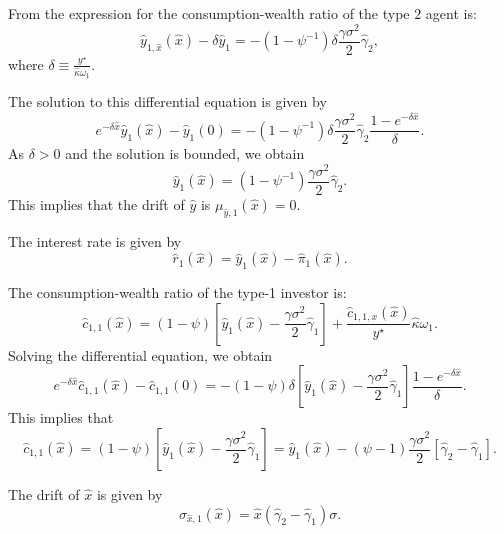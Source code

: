 \documentclass[11pt,english]{article}
\begin{document}
From the expression for the consumption-wealth ratio of the type $2$ agent is:
\begin{equation}
    \hat{y}_{1,\hat{x}}(\hat{x})-\delta \hat{y}_{1} = -(1-\psi^{-1}) \delta  \frac{\gamma\sigma^2 }{2} \hat{\gamma}_2,
\end{equation}
where $\delta \equiv \frac{y^\star}{\hat{\kappa} \omega_1}$.

The solution to this differential equation is given by
\begin{equation}
    e^ {-\delta \hat{x}} \hat{y}_1(\hat{x}) - \hat{y}_1(0) = - (1-\psi^{-1}) \delta  \frac{\gamma\sigma^2 }{2} \hat{\gamma}_2 \frac{1 - e^{-\delta \hat{x}}}{\delta}.
\end{equation}
As $\delta > 0$ and the solution is bounded, we obtain
\begin{equation}
    \hat{y}_1(\hat{x}) = (1-\psi^{-1}) \frac{\gamma\sigma^2 }{2} \hat{\gamma}_2 .
\end{equation}
This implies that the drift of $\hat{y}$ is $\mu_{\hat{y},1}(\hat{x}) = 0$.

The interest rate is given by
\begin{equation}
    \hat{r}_1(\hat{x}) = \hat{y}_1(\hat{x}) - \hat{\pi}_1(\hat{x}).
\end{equation}

The consumption-wealth ratio of the type-1 investor is:
\begin{equation}
    \hat{c}_{1,1}(\hat{x}) = (1-\psi) \left[ \hat{y}_1(\hat{x})   - \frac{\gamma \sigma^2}{2} \hat{\gamma}_1 \right] + \frac{\hat{c}_{1,1,x}(\hat{x})}{y^\star} \hat{\kappa} \omega_1.
\end{equation}
Solving the differential equation, we obtain
\begin{equation}
    e^{-\delta \hat{x}} \hat{c}_{1,1}(\hat{x})-\hat{c}_{1,1}(0)  = -(1-\psi) \delta \left[ \hat{y}_1(\hat{x})   - \frac{\gamma \sigma^2}{2} \hat{\gamma}_1 \right] \frac{1 - e^{-\delta \hat{x}}}{\delta}.
\end{equation}
This implies that
\begin{equation}
    \hat{c}_{1,1}(\hat{x}) = (1-\psi) \left[ \hat{y}_1(\hat{x})   - \frac{\gamma \sigma^2}{2} \hat{\gamma}_1 \right] = \hat{y}_1(\hat{x}) - (\psi-1) \frac{\gamma \sigma^2}{2}\left[ \hat{\gamma}_2 -\hat{\gamma}_1 \right].
\end{equation}

The drift of $\hat{x}$ is given by
\begin{equation}
    \sigma_{\hat{x},1}(\hat{x}) = \hat{x} (\hat{\gamma}_2-\hat{\gamma}_1) \sigma.
\end{equation}
\end{document}
